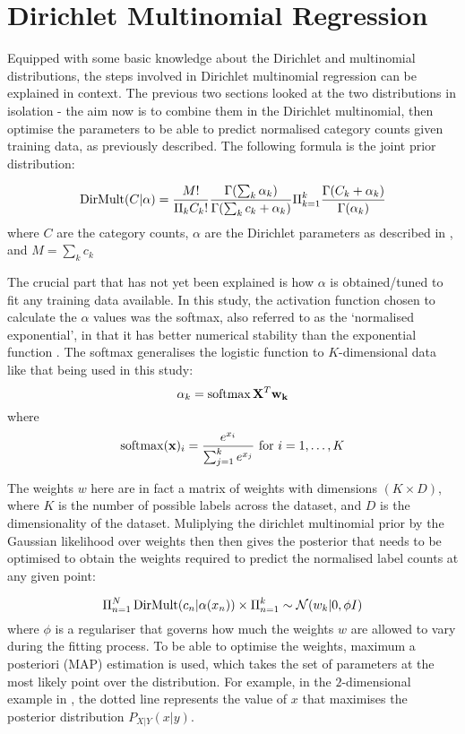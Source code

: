 \section{Dirichlet Multinomial Regression}
Equipped with some basic knowledge about the Dirichlet and multinomial distributions, the steps involved in Dirichlet multinomial regression can be explained in context. The previous two sections looked at the two distributions in isolation - the aim now is to combine them in the Dirichlet multinomial, then optimise the parameters to be able to predict normalised category counts given training data, as previously described. The following formula is the joint prior distribution:

\begin{equation}
    \operatorname{DirMult}(C|\alpha) = \frac{M!}{\Pi_k C_k!} \frac{\Gamma(\sum_k \alpha_k)}{\Gamma(\sum_k c_k + \alpha_k)} \Pi_{k=1}^k \frac{\Gamma(C_k + \alpha_k)}{\Gamma(\alpha_k)}
\end{equation}
where $C$ are the category counts, $\alpha$ are the Dirichlet parameters as described in , and $M = \sum_k c_k$

The crucial part that has not yet been explained is how $\alpha$ is obtained/tuned to fit any training data available. In this study, the activation function chosen to calculate the $\alpha$ values was the softmax, also referred to as the `normalised exponential', in that it has better numerical stability than the exponential function . The softmax generalises the logistic function to $K$-dimensional data like that being used in this study:
\begin{equation}
    \alpha_k = \operatorname{softmax}{\mathbf{X}^T \mathbf{w_k}}
\end{equation}
where \begin{equation}
    \operatorname{softmax}(\mathbf{x})_i = \frac{e^{x_i}}{\sum_{j=1}^k e^{x_j}} \text{ for } i = 1, \ldots, K
\end{equation}

The weights $w$ here are in fact a matrix of weights with dimensions $(K \times D)$, where $K$ is the number of possible labels across the dataset, and $D$ is the dimensionality of the dataset. Muliplying the dirichlet multinomial prior by the Gaussian likelihood over weights then then gives the posterior that needs to be optimised to obtain the weights required to predict the normalised label counts at any given point:

\begin{equation}
    \Pi_{n=1}^N \operatorname{DirMult} (c_n | \alpha(x_n)) \times \Pi_{n=1}^k \sim \mathcal{N}(w_k | 0, \phi I)
\end{equation}
where $\phi$ is a regulariser that governs how much the weights $w$ are allowed to vary during the fitting process. To be able to optimise the weights, maximum a posteriori (MAP) estimation is used, which takes the set of parameters at the most likely point over the distribution. For example, in the $2$-dimensional example in , the dotted line represents the value of $x$ that maximises the posterior distribution $P_{X|Y}(x|y)$.

